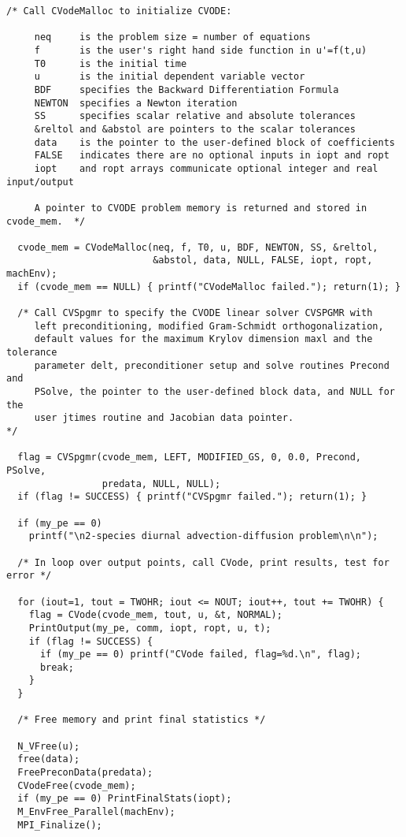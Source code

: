 \begin{verbatim}
/* Call CVodeMalloc to initialize CVODE: 

     neq     is the problem size = number of equations
     f       is the user's right hand side function in u'=f(t,u)
     T0      is the initial time
     u       is the initial dependent variable vector
     BDF     specifies the Backward Differentiation Formula
     NEWTON  specifies a Newton iteration
     SS      specifies scalar relative and absolute tolerances
     &reltol and &abstol are pointers to the scalar tolerances
     data    is the pointer to the user-defined block of coefficients
     FALSE   indicates there are no optional inputs in iopt and ropt
     iopt    and ropt arrays communicate optional integer and real input/output

     A pointer to CVODE problem memory is returned and stored in cvode_mem.  */

  cvode_mem = CVodeMalloc(neq, f, T0, u, BDF, NEWTON, SS, &reltol,
                          &abstol, data, NULL, FALSE, iopt, ropt, machEnv);
  if (cvode_mem == NULL) { printf("CVodeMalloc failed."); return(1); }

  /* Call CVSpgmr to specify the CVODE linear solver CVSPGMR with
     left preconditioning, modified Gram-Schmidt orthogonalization,
     default values for the maximum Krylov dimension maxl and the tolerance
     parameter delt, preconditioner setup and solve routines Precond and
     PSolve, the pointer to the user-defined block data, and NULL for the
     user jtimes routine and Jacobian data pointer.                          */

  flag = CVSpgmr(cvode_mem, LEFT, MODIFIED_GS, 0, 0.0, Precond, PSolve,
                 predata, NULL, NULL);
  if (flag != SUCCESS) { printf("CVSpgmr failed."); return(1); }

  if (my_pe == 0)
    printf("\n2-species diurnal advection-diffusion problem\n\n");

  /* In loop over output points, call CVode, print results, test for error */

  for (iout=1, tout = TWOHR; iout <= NOUT; iout++, tout += TWOHR) {
    flag = CVode(cvode_mem, tout, u, &t, NORMAL);
    PrintOutput(my_pe, comm, iopt, ropt, u, t);
    if (flag != SUCCESS) {
      if (my_pe == 0) printf("CVode failed, flag=%d.\n", flag);
      break;
    }
  }

  /* Free memory and print final statistics */  

  N_VFree(u);
  free(data);
  FreePreconData(predata);
  CVodeFree(cvode_mem);
  if (my_pe == 0) PrintFinalStats(iopt);
  M_EnvFree_Parallel(machEnv);
  MPI_Finalize();


\end{verbatim}
